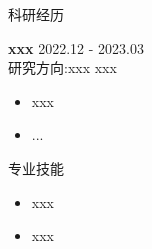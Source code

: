 \documentclass{resume} %
\begin{document}
\begin{rSection}{科研经历}

\textbf{xxx} \hfill 2022.12 - 2023.03 \\
研究方向:xxx \hfill xxx
\begin{itemize}
\item xxx
\item ...
\end{itemize}

\end{rSection}



\begin{rSection}{专业技能}
\begin{itemize}
\item xxx
\item xxx
\end{itemize}
\end{rSection}
\end{document}
